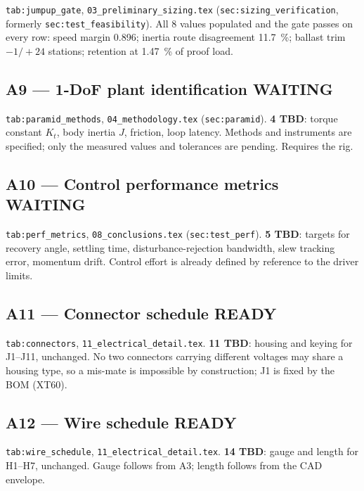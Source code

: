 \documentclass[11pt,a4paper]{article}
\newcommand{\ready}{\textcolor{readycol}{\textbf{READY}}}
\newcommand{\waiting}{\textcolor{waitcol}{\textbf{WAITING}}}
\begin{document}
\texttt{tab:jumpup\_gate}, \texttt{03\_preliminary\_sizing.tex}
(\texttt{sec:sizing\_verification}, formerly \texttt{sec:test\_feasibility}).
All 8 values populated and the gate passes on every row: speed margin
\num{0.896}; inertia route disagreement \qty{+11.7}{\percent}; ballast trim
$-1/+24$ stations; retention at \qty{1.47}{\percent} of proof load.

\subsection{A9 --- 1-DoF plant identification \quad \waiting}

\texttt{tab:paramid\_methods}, \texttt{04\_methodology.tex}
(\texttt{sec:paramid}). \textbf{4 TBD}: torque constant $K_t$, body inertia
$J$, friction, loop latency. Methods and instruments are specified; only the
measured values and tolerances are pending. Requires the rig.

\subsection{A10 --- Control performance metrics \quad \waiting}

\texttt{tab:perf\_metrics}, \texttt{08\_conclusions.tex}
(\texttt{sec:test\_perf}). \textbf{5 TBD}: targets for recovery angle,
settling time, disturbance-rejection bandwidth, slew tracking error, momentum
drift. Control effort is already defined by reference to the driver limits.

\subsection{A11 --- Connector schedule \quad \ready}

\texttt{tab:connectors}, \texttt{11\_electrical\_detail.tex}. \textbf{11 TBD}:
housing and keying for J1--J11, unchanged. No two connectors carrying
different voltages may share a housing type, so a mis-mate is impossible by
construction; J1 is fixed by the BOM (XT60).

\subsection{A12 --- Wire schedule \quad \ready}

\texttt{tab:wire\_schedule}, \texttt{11\_electrical\_detail.tex}. \textbf{14
TBD}: gauge and length for H1--H7, unchanged. Gauge follows from A3; length
follows from the CAD envelope.
\end{document}
